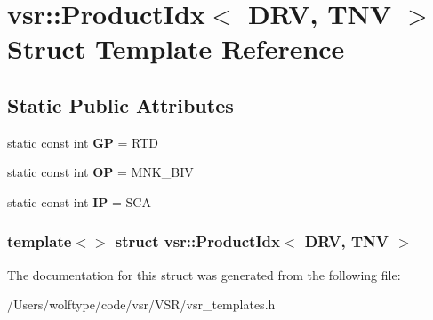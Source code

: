 \hypertarget{structvsr_1_1_product_idx_3_01_d_r_v_00_01_t_n_v_01_4}{\section{vsr\-:\-:Product\-Idx$<$ D\-R\-V, T\-N\-V $>$ Struct Template Reference}
\label{structvsr_1_1_product_idx_3_01_d_r_v_00_01_t_n_v_01_4}
}
\subsection*{Static Public Attributes}
\begin{DoxyCompactItemize}
\item 
\hypertarget{structvsr_1_1_product_idx_3_01_d_r_v_00_01_t_n_v_01_4_a9b7a2d5e8ccf4ad2547db0318d18fb58}{static const int {\bfseries G\-P} = R\-T\-D}\label{structvsr_1_1_product_idx_3_01_d_r_v_00_01_t_n_v_01_4_a9b7a2d5e8ccf4ad2547db0318d18fb58}

\item 
\hypertarget{structvsr_1_1_product_idx_3_01_d_r_v_00_01_t_n_v_01_4_a44f039b8ad8ab409ee6f9c2b4053aa62}{static const int {\bfseries O\-P} = M\-N\-K\-\_\-\-B\-I\-V}\label{structvsr_1_1_product_idx_3_01_d_r_v_00_01_t_n_v_01_4_a44f039b8ad8ab409ee6f9c2b4053aa62}

\item 
\hypertarget{structvsr_1_1_product_idx_3_01_d_r_v_00_01_t_n_v_01_4_a9e47374bab2731f67e118597403d2485}{static const int {\bfseries I\-P} = S\-C\-A}\label{structvsr_1_1_product_idx_3_01_d_r_v_00_01_t_n_v_01_4_a9e47374bab2731f67e118597403d2485}

\end{DoxyCompactItemize}
\subsubsection*{template$<$$>$ struct vsr\-::\-Product\-Idx$<$ D\-R\-V, T\-N\-V $>$}



The documentation for this struct was generated from the following file\-:\begin{DoxyCompactItemize}
\item 
/\-Users/wolftype/code/vsr/\-V\-S\-R/vsr\-\_\-templates.\-h\end{DoxyCompactItemize}
